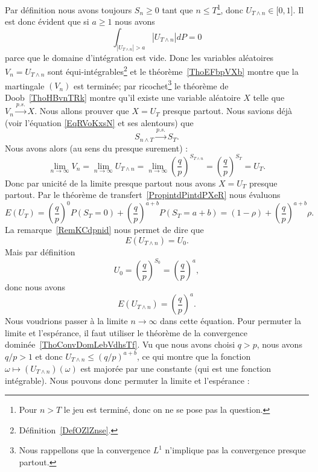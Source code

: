Par définition nous avons toujours \( S_n\geq 0\) tant que \( n\leq T\)\footnote{Pour \( n>T\) le jeu est terminé, donc on ne se pose pas la question.}, donc \( U_{T\wedge n}\in\mathopen[ 0 , 1 \mathclose]\). Il est donc évident que si \( a\geq 1\) nous avons
\begin{equation}
	\int_{| U_{T\wedge n} |>a}| U_{T\wedge n} |dP=0
\end{equation}
parce que le domaine d'intégration est vide. Donc les variables aléatoires \( V_n=U_{T\wedge n}\) sont équi-intégrables\footnote{Définition~\ref{DefOZlZnse}.} et le théorème~\ref{ThoEFbpVXb} montre que la martingale \( (V_n)\) est terminée; par ricochet\footnote{Nous rappellons que la convergence \( L^1\) n'implique pas la convergence presque partout.} le théorème de Doob~\ref{ThoHBvnTRk} montre qu'il existe une variable aléatoire \( X\) telle que \( V_n\stackrel{p.s.}{\longrightarrow}X\). Nous allons prouver que \( X=U_T\) presque partout. Nous savions déjà (voir l'équation \eqref{EqRVoKxsN} et ses alentours) que
\begin{equation}
	S_{n\wedge T}\stackrel{p.s.}{\longrightarrow}S_T.
\end{equation}
Nous avons alors (au sens du presque surement) :
\begin{equation}
	\lim_{n\to \infty} V_n=\lim_{n\to \infty} U_{T\wedge n}=\lim_{n\to \infty} \left( \frac{ q }{ p } \right)^{S_{T\wedge n}}=\left( \frac{ q }{ p } \right)^{S_T}=U_T.
\end{equation}
Donc par unicité de la limite presque partout nous avons \( X=U_T\) presque partout. Par le théorème de transfert~\ref{PropintdPintdPXeR} nous évaluons
\begin{equation}    \label{EqYFycUag}
	E(U_T)=\left( \frac{ q }{ p } \right)^0P(S_T=0)+\left( \frac{ q }{ p } \right)^{a+b}P(S_T=a+b)=(1-\rho)+\left( \frac{ q }{ p } \right)^{a+b}\rho.
\end{equation}
La remarque~\ref{RemKCdpnid} nous permet de dire que
\begin{equation}
	E(U_{T\wedge n})=U_0.
\end{equation}
Mais par définition
\begin{equation}
	U_0=\left( \frac{ q }{ p } \right)^{S_0}=\left( \frac{ q }{ p } \right)^a,
\end{equation}
donc nous avons
\begin{equation}
	E(U_{T\wedge n})=\left( \frac{ q }{ p } \right)^a.
\end{equation}
Nous voudrions passer à la limite \( n\to \infty\) dans cette équation. Pour permuter la limite et l'espérance, il faut utiliser le théorème de la convergence dominée~\ref{ThoConvDomLebVdhsTf}. Vu que nous avons choisi \( q>p\), nous avons \( q/p>1\) et donc \( U_{T\wedge n}\leq (q/p)^{a+b}\), ce qui montre que la fonction \( \omega\mapsto (U_{T\wedge n})(\omega)\) est majorée par une constante (qui est une fonction intégrable). Nous pouvons donc permuter la limite et l'espérance :
